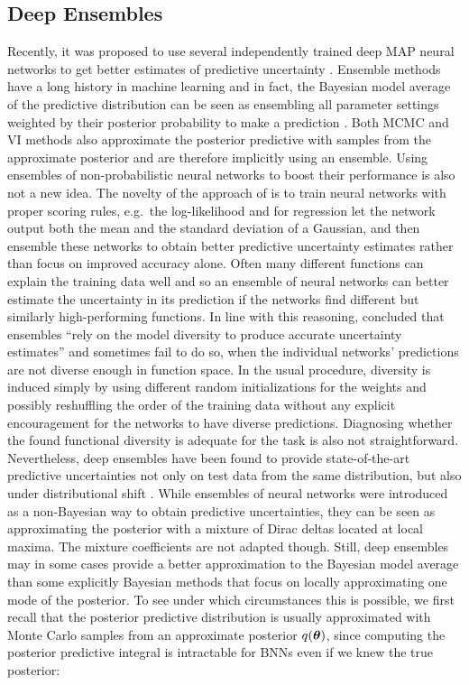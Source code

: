 \documentclass[../thesis.tex]{subfiles}
\begin{document}
\subsection*{Deep Ensembles}
Recently, it was proposed to use several independently trained deep MAP neural networks to get better estimates of predictive uncertainty \parencite{lakshminarayanan2017simple}. Ensemble methods have a long history in machine learning and in fact, the Bayesian model average of the predictive distribution can be seen as ensembling all parameter settings weighted by their posterior probability to make a prediction \parencite{dietterich2000ensemble}. Both MCMC and VI methods also approximate the posterior predictive with samples from the approximate posterior and are therefore implicitly using an ensemble. Using ensembles of non-probabilistic neural networks to boost their performance is also not a new idea. The novelty of the approach of \textcite{lakshminarayanan2017simple} is to train neural networks with proper scoring rules, e.g.\ the log-likelihood and for regression let the network output both the mean and the standard deviation of a Gaussian, and then ensemble these networks to obtain better predictive uncertainty estimates rather than focus on improved accuracy alone. Often many different functions can explain the training data well and so an ensemble of neural networks can better estimate the uncertainty in its prediction if the networks find different but similarly high-performing functions. In line with this reasoning, \textcite{yao2019quality} concluded that ensembles ``rely on the model diversity to produce accurate uncertainty estimates'' and sometimes fail to do so, when the individual networks' predictions are not diverse enough in function space. In the usual procedure, diversity is induced simply by using different random initializations for the weights and possibly reshuffling the order of the training data without any explicit encouragement for the networks to have diverse predictions. Diagnosing whether the found functional diversity is adequate for the task is also not straightforward.
Nevertheless, deep ensembles have been found to provide state-of-the-art predictive uncertainties not only on test data from the same distribution, but also under distributional shift \parencite{ovadia2019can}. 
While ensembles of neural networks were introduced as a non-Bayesian way to obtain predictive uncertainties, they can be seen as approximating the posterior with a mixture of Dirac deltas located at local maxima. The mixture coefficients are not adapted though. Still, deep ensembles may in some cases provide a better approximation to the Bayesian model average than some explicitly Bayesian methods that focus on locally approximating one mode of the posterior. To see under which circumstances this is possible, we first recall that the posterior predictive distribution is usually approximated with Monte Carlo samples from an approximate posterior $q(\boldsymbol{\mathbf{\theta}})$, since computing the posterior predictive integral is intractable for BNNs even if we knew the true posterior:
\end{document}
